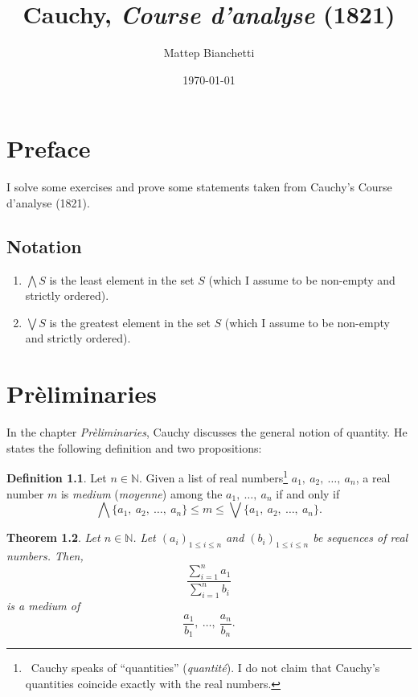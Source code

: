 \documentclass[11pt,oneside]{book}
\title{Cauchy, \textit{Course d'analyse} (1821)}
\author{Mattep Bianchetti}
\date{\today}  %
\newtheorem{theorem}{Theorem}[chapter]
\theoremstyle{definition}
\newtheorem{definition}[theorem]{Definition}
\theoremstyle{remark}
\newcommand{\N}{\mathbb{N}}  %
\begin{document}
\frontmatter
\maketitle

\tableofcontents

\mainmatter

\chapter*{Preface}
I solve some exercises and prove some statements taken from Cauchy's Course d'analyse (1821).

\section*{Notation}
\begin{enumerate}
    \item $\bigwedge S$ is the least element in the set $S$ (which I assume to be non-empty and strictly ordered).
    \item $\bigvee S$ is the greatest element in the set $S$ (which I assume to be non-empty and strictly ordered).
\end{enumerate}
 
\chapter{Pr\`{e}liminaries}
In the chapter \textit{Pr\`{e}liminaries}, Cauchy discusses the general notion of quantity. He states the following definition and two propositions:

\bigskip

\begin{definition}
    Let $n\in \N$. Given a list of real numbers\footnote{
    ~Cauchy speaks of ``quantities'' (\textit{quantit\'{e}}). I do not claim that Cauchy's quantities coincide exactly with the real numbers.
    }
    $a_1,\ a_2,\ \dots,\ a_n$, a real number $m$ is \textit{medium} (\textit{moyenne}) among the $a_1,\ \dots,\ a_n$ if and only if
    \[
        \bigwedge \{a_1,\ a_2,\ \dots,\ a_n\} \leq m \leq \bigvee \{a_1,\ a_2,\ \dots,\ a_n\}.
    \]
\end{definition}

\bigskip

\begin{theorem}\label{theorem.medium}
Let $n\in \N$. Let $(a_i)_{1\leq i \leq n}$ and $(b_i)_{1\leq i \leq n}$ be sequences of real numbers. Then,
\[
    \frac{\sum_{i=1}^{n} a_1}{\sum_{i=1}^{n} b_i}
\]
is a medium of  
\[
    \frac{a_1}{b_1},\ \dots,\ \frac{a_n}{b_n}.
\]
\end{theorem}
\end{document}
